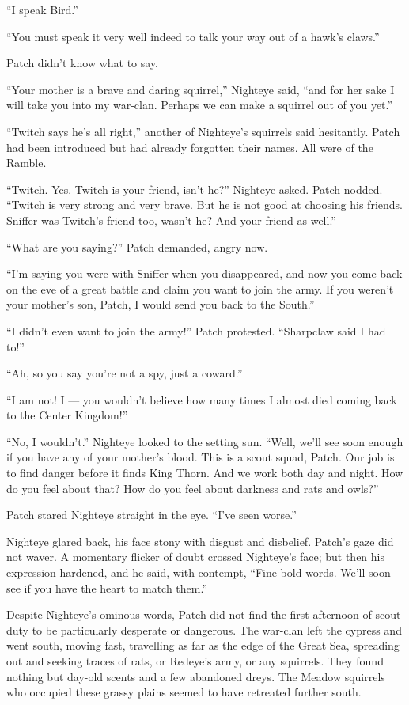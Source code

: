 \documentclass[12pt]{memoir}
\begin{document}
“I speak Bird.”

“You must speak it very well indeed to talk your way out of a hawk’s
claws.”

Patch didn’t know what to say.

“Your mother is a brave and daring squirrel,” Nighteye said, “and for
her sake I will take you into my war-clan. Perhaps we can make a
squirrel out of you yet.”

“Twitch says he’s all right,” another of Nighteye’s squirrels said
hesitantly. Patch had been introduced but had already forgotten their
names. All were of the Ramble.

“Twitch. Yes. Twitch is your friend, isn’t he?” Nighteye asked. Patch
nodded. “Twitch is very strong and very brave. But he is not good at
choosing his friends. Sniffer was Twitch’s friend too, wasn’t he? And
your friend as well.”

“What are you saying?” Patch demanded, angry now.

“I’m saying you were with Sniffer when you disappeared, and now you
come back on the eve of a great battle and claim you want to join the
army. If you weren’t your mother’s son, Patch, I would send you back
to the South.”

“I didn’t even want to join the army!” Patch protested. “Sharpclaw
said I had to!”

“Ah, so you say you’re not a spy, just a coward.”

“I am not! I — you wouldn’t believe how many times I almost died
coming back to the Center Kingdom!”

“No, I wouldn’t.” Nighteye looked to the setting sun. “Well, we’ll see
soon enough if you have any of your mother’s blood. This is a scout
squad, Patch. Our job is to find danger before it finds King
Thorn. And we work both day and night. How do you feel about that? How
do you feel about darkness and rats and owls?”

Patch stared Nighteye straight in the eye. “I’ve seen worse.”

Nighteye glared back, his face stony with disgust and
disbelief. Patch’s gaze did not waver. A momentary flicker of doubt
crossed Nighteye’s face; but then his expression hardened, and he
said, with contempt, “Fine bold words. We’ll soon see if you have the
heart to match them.”

Despite Nighteye’s ominous words, Patch did not find the first
afternoon of scout duty to be particularly desperate or dangerous. The
war-clan left the cypress and went south, moving fast, travelling as
far as the edge of the Great Sea, spreading out and seeking traces of
rats, or Redeye’s army, or any squirrels. They found nothing but
day-old scents and a few abandoned dreys. The Meadow squirrels who
occupied these grassy plains seemed to have retreated further south.
\end{document}
